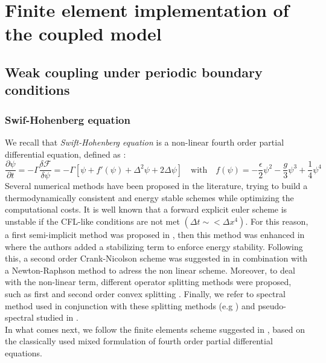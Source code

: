 \documentclass{article}
\begin{document}
\section{Finite element implementation of the coupled model}
\subsection{Weak coupling under periodic boundary conditions}
\subsubsection{Swif-Hohenberg equation}
We recall that \textit{Swift-Hohenberg equation} is a non-linear fourth order partial differential equation, defined as :
\begin{equation}
   \frac{\partial \psi}{\partial t} = - \Gamma \frac{\delta \mathcal{F}}{\delta \psi} = - \Gamma \left[ \psi + f'(\psi) + \Delta^2 \psi +2 \Delta \psi  \right] \quad \text{with} \quad f(\psi) = -\frac{\epsilon}{2} \psi^2 - \frac{g}{3}\psi^3 + \frac{1}{4} \psi^4
\end{equation}
Several numerical methods have been proposed in the literature, trying to build a thermodynamically consistent and energy stable schemes while optimizing the computational costs.
It is well known that a forward explicit euler scheme is unstable if the CFL-like conditions are not met $(\Delta t\sim < \Delta x^4)$. For this reason, a first semi-implicit method was proposed in \cite{chengEfficientAlgorithmSolving2008}, then this method was enhanced in \cite{elseySimpleEfficientScheme2013} where the authors added a stabilizing term to enforce energy stability. Following this, a second order Crank-Nicolson scheme was suggested in \cite{gomezNewSpaceTime2012} in combination with a Newton-Raphson method to adress the non linear scheme. Moreover, to deal with the non-linear term, different operator splitting methods were proposed, such as first and second order convex splitting \cite{huStableEfficientFinitedifference2009}. Finally, we refer to spectral method used in conjunction with these splitting methods (e.g \cite{leeSemianalyticalFourierSpectral2017}) and pseudo-spectral studied in \cite{zhaiStabilityErrorEstimate2021}.\\

In what comes next, we follow the finite elements scheme suggested in \cite{qiNumericalAnalysisSecondorder2024}, based on the classically used mixed formulation of fourth order partial differential equations.
\end{document}
